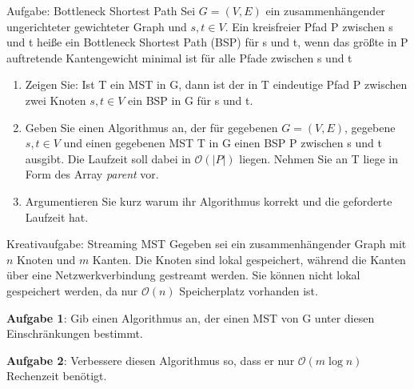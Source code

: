 \begin{frame}{Aufgabe: Bottleneck Shortest Path}
	Sei $G = (V, E)$ ein zusammenhängender ungerichteter gewichteter Graph und $s, t \in V$. Ein kreisfreier Pfad P zwischen s und t heiße ein Bottleneck Shortest Path (BSP) für s und t,
	wenn das größte in P auftretende Kantengewicht minimal ist für alle Pfade zwischen s und t
	\begin{enumerate}
		\item Zeigen Sie: Ist T ein MST in G, dann ist der in T eindeutige Pfad P zwischen zwei Knoten $s, t \in V$ ein BSP in G für s und t.
		\item Geben Sie einen Algorithmus an, der für gegebenen $G = (V, E)$, gegebene $s, t \in V$ und einen gegebenen MST T in G einen BSP P zwischen s und t ausgibt.
		Die Laufzeit soll dabei in $\mathcal{O}(|P|)$ liegen.
		Nehmen Sie an T liege in Form des Array \textit{parent} vor.
		\item Argumentieren Sie kurz warum ihr Algorithmus korrekt und die geforderte Laufzeit hat.
	\end{enumerate}

\end{frame}


\begin{frame}{Kreativaufgabe: Streaming MST}
	Gegeben sei ein zusammenhängender Graph mit $n$ Knoten und $m$ Kanten.
	Die Knoten sind lokal gespeichert, während die Kanten über eine Netzwerkverbindung gestreamt werden.
	Sie können nicht lokal gespeichert werden, da nur $\mathcal{O}(n)$ Speicherplatz vorhanden ist.

	\textbf{Aufgabe 1}: Gib einen Algorithmus an, der einen MST von G unter diesen Einschränkungen bestimmt.

	\textbf{Aufgabe 2}: Verbessere diesen Algorithmus so, dass er nur $\mathcal{O}(m \log{n})$ Rechenzeit benötigt.
\end{frame}


